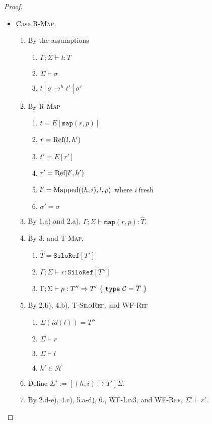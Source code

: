 \begin{proof}
\begin{itemize}
\item Case \textsc{R-Map}.
\begin{enumerate}
\item By the assumptions
  \begin{enumerate}[label=(\alph*)]
  \item $\Gamma ; \Sigma \vdash t : T$
  \item $\Sigma \vdash \sigma$
  \item $t~|~\sigma \rightarrow^h t'~|~\sigma'$
  \end{enumerate}
\item By \textsc{R-Map}
  \begin{enumerate}[label=(\alph*)]
  \item $t  = E[\texttt{map}(r, p)]$
  \item $r  = {\textrm{Ref}(l, h')}$
  \item $t' = E[r']$
  \item $r' = {\textrm{Ref}(l', h')}$
  \item $l' = {\textrm{Mapped}((h, i), l, p)}$ where $i~\text{fresh}$
  \item $\sigma' = \sigma$
  \end{enumerate}
\item By 1.a) and 2.a), $\Gamma ; \Sigma \vdash \texttt{map}(r, p) : \hat{T}$.
\item By 3. and \textsc{T-Map},
  \begin{enumerate}[label=(\alph*)]
  \item $\hat{T} = \texttt{SiloRef}[T']$
  \item $\Gamma ; \Sigma \vdash r : \texttt{SiloRef}[T'']$
  \item $\Gamma ; \Sigma \vdash p : T'' \Rightarrow T'~\{~\texttt{type}~\mathcal{C} = \overline{T}~\}$
  \end{enumerate}
\item By 2.b), 4.b), \textsc{T-SiloRef}, and \textsc{WF-Ref}
  \begin{enumerate}[label=(\alph*)]
  \item $\Sigma(id(l)) = T''$
  \item $\Sigma \vdash r$
  \item $\Sigma \vdash l$
  \item $h' \in \mathcal{H}$
  \end{enumerate}
\item Define $\Sigma' := [(h, i) \mapsto T']\Sigma$.
\item By 2.d-e), 4.c), 5.a-d), 6., \textsc{WF-Lin3}, and \textsc{WF-Ref}, $\Sigma' \vdash r'$.

\end{enumerate}
\end{itemize}
\end{proof}
